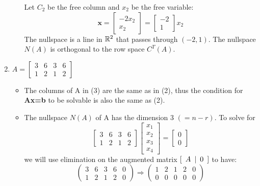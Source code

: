 \begin{enumerate}[label={(\arabic*)}]
\begin{itemize}
        Let \(C_2\) be the free column and \(x_2\) be the free variable: \[\textbf{x} = \begin{bmatrix} -2x_2 \\ x_2 \end{bmatrix} = \begin{bmatrix} -2 \\ 1\end{bmatrix}x_2 \]
        The nullspace is a line in \(\mathbb{R}^2\) that passes through \((-2, 1)\). The nullspace \(N(A)\) is orthogonal to the row space \(C^T(A)\). 
    \end{itemize}
    
    
    
    \item  \(A = \begin{bmatrix} 3 & 6 & 3 & 6 \\ 1 & 2 & 1 & 2 \end{bmatrix}\) 
    \begin{itemize}
        \item The columns of A in (3) are the same as in (2), thus the condition for \textbf{Ax=b} to be solvable is also the same as (2).
        \item The nullspace \(N(A)\) of A has the dimension 3 \((=n-r)\). To solve for 
        \[\begin{bmatrix} 3 & 6 & 3 & 6 \\ 1 & 2 & 1 & 2 \end{bmatrix} \begin{bmatrix} x_1 \\ x_2 \\ x_3 \\ x_4 \end{bmatrix} = \begin{bmatrix} 0 \\ 0 \end{bmatrix}\]
        we will use elimination on the augmented matrix  \([\hspace{0.5em} A \hspace{0.5em} |\hspace{0.5em} 0 \hspace{0.5em}]\)  to have:
        \[\left(\begin{array}{cccc|c}  3 & 6 & 3 & 6 & 0 \\ 1 & 2 & 1 & 2 & 0 \end{array}\right) \Longrightarrow \left(\begin{array}{cccc|c}  1 & 2 & 1 & 2 & 0 \\ 0 & 0 & 0 & 0 & 0\end{array}\right) \]

\end{itemize}
\end{enumerate}
